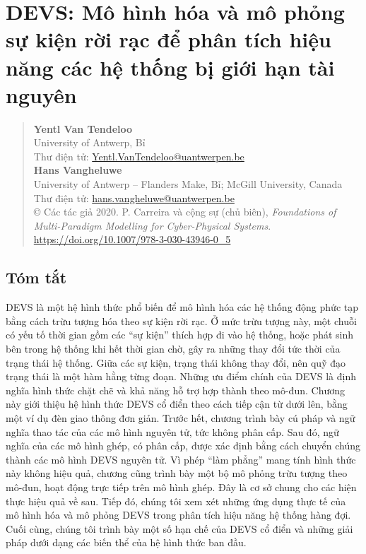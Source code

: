 \chapter{DEVS: Mô hình hóa và mô phỏng sự kiện rời rạc để phân tích hiệu năng các hệ thống bị giới hạn tài nguyên}

\begin{quote}\small
\textbf{Yentl Van Tendeloo}\\
University of Antwerp, Bỉ\\
Thư điện tử: \url{Yentl.VanTendeloo@uantwerpen.be}\\
\textbf{Hans Vangheluwe}\\
University of Antwerp -- Flanders Make, Bỉ; McGill University, Canada\\
Thư điện tử: \url{hans.vangheluwe@uantwerpen.be}\\
\copyright{} Các tác giả 2020. P. Carreira và cộng sự (chủ biên), \emph{Foundations of Multi-Paradigm Modelling for Cyber-Physical Systems}.\\
\url{https://doi.org/10.1007/978-3-030-43946-0_5}
\end{quote}

\section*{Tóm tắt}
DEVS là một hệ hình thức phổ biến để mô hình hóa các hệ thống động phức tạp bằng cách trừu tượng hóa theo sự kiện rời rạc. Ở mức trừu tượng này, một chuỗi có yếu tố thời gian gồm các ``sự kiện'' thích hợp đi vào hệ thống, hoặc phát sinh bên trong hệ thống khi hết thời gian chờ, gây ra những thay đổi tức thời của trạng thái hệ thống. Giữa các sự kiện, trạng thái không thay đổi, nên quỹ đạo trạng thái là một hàm hằng từng đoạn. Những ưu điểm chính của DEVS là định nghĩa hình thức chặt chẽ và khả năng hỗ trợ hợp thành theo mô-đun. Chương này giới thiệu hệ hình thức DEVS cổ điển theo cách tiếp cận từ dưới lên, bằng một ví dụ đèn giao thông đơn giản. Trước hết, chương trình bày cú pháp và ngữ nghĩa thao tác của các mô hình nguyên tử, tức không phân cấp. Sau đó, ngữ nghĩa của các mô hình ghép, có phân cấp, được xác định bằng cách chuyển chúng thành các mô hình DEVS nguyên tử. Vì phép ``làm phẳng'' mang tính hình thức này không hiệu quả, chương cũng trình bày một bộ mô phỏng trừu tượng theo mô-đun, hoạt động trực tiếp trên mô hình ghép. Đây là cơ sở chung cho các hiện thực hiệu quả về sau. Tiếp đó, chúng tôi xem xét những ứng dụng thực tế của mô hình hóa và mô phỏng DEVS trong phân tích hiệu năng hệ thống hàng đợi. Cuối cùng, chúng tôi trình bày một số hạn chế của DEVS cổ điển và những giải pháp dưới dạng các biến thể của hệ hình thức ban đầu.

